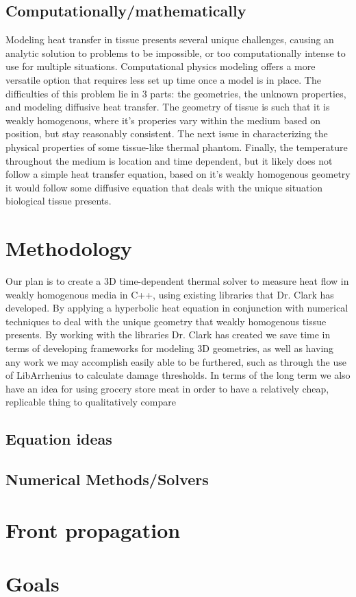 \documentclass[12pt]{article}
\begin{document}
\subsection{Computationally/mathematically}
Modeling heat transfer in tissue presents several unique challenges, causing an analytic solution to problems to be impossible, or too computationally intense to use for multiple situations. Computational physics modeling offers a more versatile option that requires less set up time once a model is in place. The difficulties of this problem lie in 3 parts: the geometries, the unknown properties, and modeling diffusive heat transfer.
The geometry of tissue is such that it is weakly homogenous, where it's properies vary within the medium based on position, but stay reasonably consistent. The next issue in characterizing the physical properties of some tissue-like thermal phantom. Finally, the temperature throughout the medium is location and time dependent, but it likely does not follow a simple heat transfer equation, based on it's weakly homogenous geometry it would follow some diffusive equation that deals with the unique situation biological tissue presents.
\section{Methodology}
Our plan is to create a 3D time-dependent thermal solver to measure heat flow in weakly homogenous media in C++, using existing libraries that Dr. Clark has developed. By applying a hyperbolic heat equation in conjunction with numerical techniques to deal with the unique geometry that weakly homogenous tissue presents. By working with the libraries Dr. Clark has created we save time in terms of developing frameworks for modeling 3D geometries, as well as having any work we may accomplish easily able to be furthered, such as through the use of LibArrhenius to calculate damage thresholds. In terms of the long term we also have an idea for using grocery store meat in order to have a relatively cheap, replicable thing to qualitatively compare

\subsection{Equation ideas}
\subsection{Numerical Methods/Solvers}
\section{Front propagation}
\section{Goals}
\end{document}

